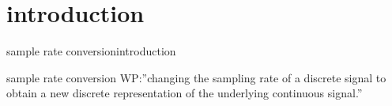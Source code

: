 


\subtitle{Part 18: Sample Rate Conversion (SRC)}


	

\section[intro]{introduction}
	\begin{frame}{sample rate conversion}{introduction }
        \vspace{-3mm}
        \begin{block}{sample rate conversion}
            WP:''changing the sampling rate of a discrete signal to obtain a new discrete representation of the underlying continuous signal.''
        \end{block}
        \bigskip
        \vspace{30mm}    
	\end{frame}

